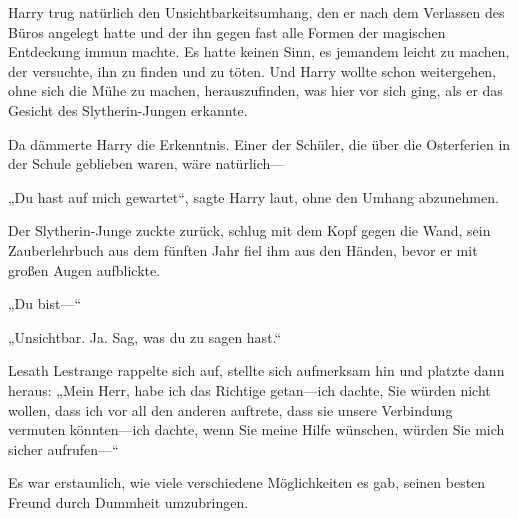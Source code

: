 Harry trug natürlich den Unsichtbarkeitsumhang, den er nach dem Verlassen des Büros angelegt hatte und der ihn gegen fast alle Formen der magischen Entdeckung immun machte. Es hatte keinen Sinn, es jemandem leicht zu machen, der versuchte, ihn zu finden und zu töten. Und Harry wollte schon weitergehen, ohne sich die Mühe zu machen, herauszufinden, was hier vor sich ging, als er das Gesicht des Slytherin-Jungen erkannte.

Da dämmerte Harry die Erkenntnis. Einer der Schüler, die über die Osterferien in der Schule geblieben waren, wäre natürlich—

„Du hast auf mich gewartet“, sagte Harry laut, ohne den Umhang abzunehmen.

Der Slytherin-Junge zuckte zurück, schlug mit dem Kopf gegen die Wand, sein Zauberlehrbuch aus dem fünften Jahr fiel ihm aus den Händen, bevor er mit großen Augen aufblickte.

„Du bist—“

„Unsichtbar. Ja. Sag, was du zu sagen hast.“

Lesath Lestrange rappelte sich auf, stellte sich aufmerksam hin und platzte dann heraus: „Mein Herr, habe ich das Richtige getan—ich dachte, Sie würden nicht wollen, dass ich vor all den anderen auftrete, dass sie unsere Verbindung vermuten könnten—ich dachte, wenn Sie meine Hilfe wünschen, würden Sie mich sicher aufrufen—“

Es war erstaunlich, wie viele verschiedene Möglichkeiten es gab, seinen besten Freund durch Dummheit umzubringen.

